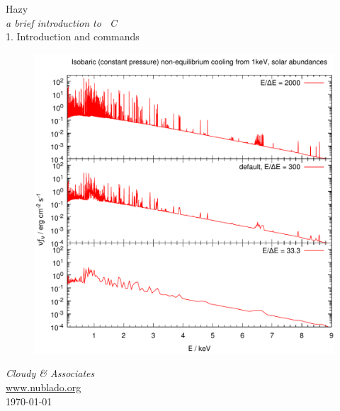 \documentclass[12pt]{book}
\begin{document}
\frontmatter

\begin{titlepage}
\begin{center}

\Huge
Hazy\\
\Large
\emph{a brief introduction to \Cloudy\ C\VERSION}\\
\LARGE
1. Introduction and commands

\begin{figure}
\begin{center}
\hspace*{-1cm}
\includegraphics[clip=on,width=\columnwidth,height=0.6\textheight,keepaspectratio]{cooling-flow-spectrum-hazy1}
\end{center}
\end{figure}

\vspace{10 mm }
\LARGE
\emph{Cloudy \& Associates} \\
\Large
\href{http://www.nublado.org}{www.nublado.org} \\
\normalsize
\today
\end{center}
\end{titlepage}
\end{document}
